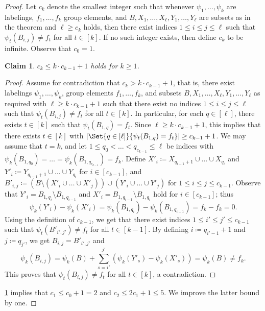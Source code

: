 \documentclass{article}
\newtheorem{claim}[theorem]{Claim}
\theoremstyle{definition}
\newcommand{\cups}{\cup\dots\cup}
\begin{document}
\begin{proof}
Let $c_k$ denote the smallest integer such that whenever $\psi_1, \dots, \psi_k$ are labelings, $f_1, \dots, f_k$ group elements, and $B, X_1,\dots, X_\ell, Y_1,\dots, Y_\ell$ are subsets as in the theorem and $\ell \ge c_k$ holds, then there exist indices $1 \le i \le j \le \ell$ such that $\psi_t(B_{i,j}) \ne f_t$ for all $t \in [k]$. If no such integer exists, then define $c_k$ to be infinite.
Observe that $c_0 = 1$.

\begin{claim} \label{cl:recursion}
$c_k \le k \cdot c_{k-1}+1$ holds for $k \ge 1$.
\end{claim}
\begin{proof}
Assume for contradiction that $c_k > k \cdot c_{k-1} + 1$, that is, there exist labelings $\psi_1,\dots, \psi_k$, group elements $f_1,\dots, f_k$, and subsets $B, X_1,\dots, X_\ell, Y_1,\dots, Y_\ell$ as required with $\ell \ge k \cdot c_{k-1} + 1$ such that there exist no indices $1\le i \le j \le \ell$ such that $\psi_t(B_{i,j}) \ne f_t$ for all $t \in [k]$.
In particular, for each $q \in [\ell]$, there exists $t \in [k]$ such that $\psi_t(B_{1,q}) = f_t$. Since $\ell \ge k \cdot c_{k-1}+1$, this implies that there exists $t \in [k]$ with $|\Set{q \in [\ell]}{ \psi_t(B_{1,q}) = f_t}| \ge c_{k-1}+1$. We may assume that $t=k$, and let $1 \le q_0 < \dots < q_{c_{k-1}} \le \ell$ be indices with $\psi_k(B_{1,q_0}) = \dots = \psi_k(B_{1, q_{c_{k-1}}}) = f_k$. 
Define $X'_i \coloneqq X_{q_{i-1}+1} \cups X_{q_i}$ and $Y'_i \coloneqq Y_{q_{i-1}+1} \cups Y_{q_i}$ for $i \in [c_{k-1}]$, and $B'_{i,j} \coloneqq (B\setminus (X'_i\cups X'_j)) \cup (Y'_i\cups Y'_j)$ for $1\le i \le j \le c_{k-1}$. 
Observe that $Y'_i = B_{1, q_i} \setminus B_{1, q_{i-1}}$ and $X'_i = B_{1, q_{i-1}} \setminus B_{1, q_i}$ hold for $i \in [c_{k-1}]$; thus
\[
\psi_k(Y'_i) - \psi_k(X'_i) = \psi_k(B_{1, q_i}) - \psi_k(B_{1, q_{i-1}})  = f_k-f_k = 0.
\]
Using the definition of $c_{k-1}$, we get that there exist indices $1 \le i' \le j' \le c_{k-1}$ such that $\psi_t(B'_{i',j'}) \ne f_t$ for all $t \in [k-1]$.
By defining $i \coloneqq q_{i'-1}+1$ and $j \coloneqq q_{j'}$, we get $B_{i,j} = B'_{i',j'}$ and 
\[\psi_k(B_{i,j})  = \psi_k(B) + \sum_{s = i'}^{j'} (\psi_k(Y'_s)-\psi_k(X'_s)) = \psi_k(B) \ne f_k. 
\]
This proves that $\psi_t(B_{i,j}) \ne f_t$ for all $t \in [k]$, a contradiction.
\end{proof}

\cref{cl:recursion} implies that $c_1 \le c_0+1 = 2$ and $c_2\le 2c_1+1 \le 5$. We improve the latter bound by one.


\end{proof}
\end{document}
